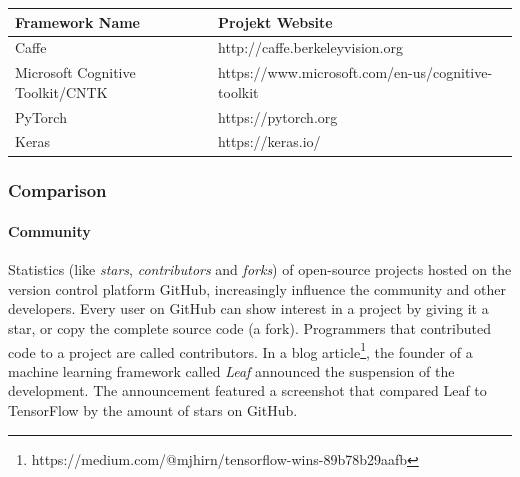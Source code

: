 \begin{longtable}[]{@{}ll@{}}
\toprule
\begin{minipage}[b]{0.37\columnwidth}\raggedright\strut
Framework Name\strut
\end{minipage} & \begin{minipage}[b]{0.57\columnwidth}\raggedright\strut
Projekt Website\strut
\end{minipage}\tabularnewline
\midrule
\endhead
\begin{minipage}[t]{0.37\columnwidth}\raggedright\strut
Caffe\strut
\end{minipage} & \begin{minipage}[t]{0.57\columnwidth}\raggedright\strut
http://caffe.berkeleyvision.org\strut
\end{minipage}\tabularnewline
\begin{minipage}[t]{0.37\columnwidth}\raggedright\strut
Microsoft Cognitive Toolkit/CNTK\strut
\end{minipage} & \begin{minipage}[t]{0.57\columnwidth}\raggedright\strut
https://www.microsoft.com/en-us/cognitive-toolkit\strut
\end{minipage}\tabularnewline
\begin{minipage}[t]{0.37\columnwidth}\raggedright\strut
PyTorch\strut
\end{minipage} & \begin{minipage}[t]{0.57\columnwidth}\raggedright\strut
https://pytorch.org\strut
\end{minipage}\tabularnewline
\begin{minipage}[t]{0.37\columnwidth}\raggedright\strut
Keras\strut
\end{minipage} & \begin{minipage}[t]{0.57\columnwidth}\raggedright\strut
https://keras.io/\strut
\end{minipage}\tabularnewline
\bottomrule
\end{longtable}

\subsubsection{Comparison}\label{comparison-1}

\paragraph{Community}\label{community-1}

Statistics (like \emph{stars}, \emph{contributors} and \emph{forks}) of
open-source projects hosted on the version control platform GitHub,
increasingly influence the community and other developers. Every user on
GitHub can show interest in a project by giving it a star, or copy the
complete source code (a fork). Programmers that contributed code to a
project are called contributors. In a blog article\footnote{https://medium.com/@mjhirn/tensorflow-wins-89b78b29aafb},
the founder of a machine learning framework called \emph{Leaf} announced
the suspension of the development. The announcement featured a
screenshot that compared Leaf to TensorFlow by the amount of stars on
GitHub.

